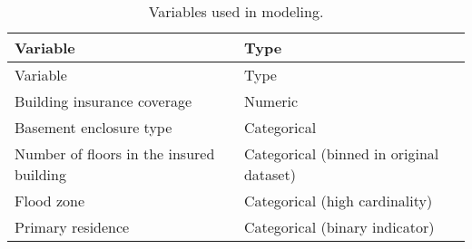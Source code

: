 \documentclass{article}
\begin{document}
\begin{longtable}[]{@{}ll@{}}
\caption{\label{tab:variables} Variables used in
modeling.}\tabularnewline
\toprule
\begin{minipage}[b]{0.47\columnwidth}\raggedright
Variable\strut
\end{minipage} & \begin{minipage}[b]{0.47\columnwidth}\raggedright
Type\strut
\end{minipage}\tabularnewline
\midrule
\endfirsthead
\toprule
\begin{minipage}[b]{0.47\columnwidth}\raggedright
Variable\strut
\end{minipage} & \begin{minipage}[b]{0.47\columnwidth}\raggedright
Type\strut
\end{minipage}\tabularnewline
\midrule
\endhead
\begin{minipage}[t]{0.47\columnwidth}\raggedright
Building insurance coverage\strut
\end{minipage} & \begin{minipage}[t]{0.47\columnwidth}\raggedright
Numeric\strut
\end{minipage}\tabularnewline
\begin{minipage}[t]{0.47\columnwidth}\raggedright
Basement enclosure type\strut
\end{minipage} & \begin{minipage}[t]{0.47\columnwidth}\raggedright
Categorical\strut
\end{minipage}\tabularnewline
\begin{minipage}[t]{0.47\columnwidth}\raggedright
Number of floors in the insured building\strut
\end{minipage} & \begin{minipage}[t]{0.47\columnwidth}\raggedright
Categorical (binned in original dataset)\strut
\end{minipage}\tabularnewline
\begin{minipage}[t]{0.47\columnwidth}\raggedright
Flood zone\strut
\end{minipage} & \begin{minipage}[t]{0.47\columnwidth}\raggedright
Categorical (high cardinality)\strut
\end{minipage}\tabularnewline
\begin{minipage}[t]{0.47\columnwidth}\raggedright
Primary residence\strut
\end{minipage} & \begin{minipage}[t]{0.47\columnwidth}\raggedright
Categorical (binary indicator)\strut
\end{minipage}\tabularnewline
\bottomrule
\end{longtable}
\end{document}
